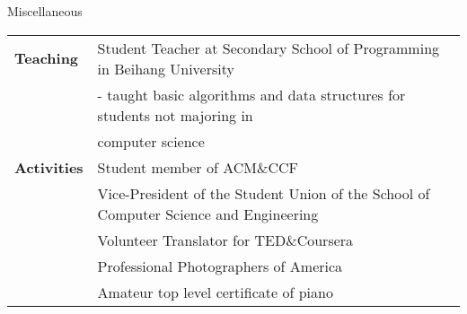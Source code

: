 \documentclass{resume} %
\begin{document}
\begin{rSection}{Miscellaneous}
\begin{tabular}{ @{} >{\bfseries}l @{\hspace{6ex}} l }
Teaching & Student Teacher at Secondary School of Programming in Beihang University \\
& \hspace{8pt}- taught basic algorithms and data structures for students not majoring in \\
& \hspace{8pt} computer science \\
Activities & Student member of ACM\&CCF \\
& Vice-President of the Student Union of the School of Computer Science and Engineering \\
& Volunteer Translator for TED\&Coursera \\
& Professional Photographers of America \\
& Amateur top level certificate of piano
\end{tabular}
\end{rSection}

\end{document}
